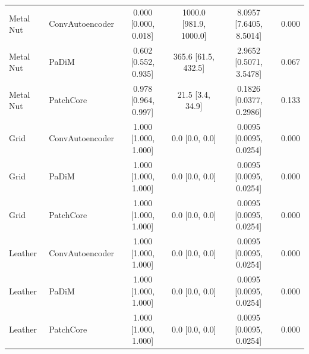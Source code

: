 \begin{table}[t]
{\begin{tabular}{llcccc}
\midrule
Metal Nut & ConvAutoencoder & 0.000 [0.000, 0.018] & 1000.0 [981.9, 1000.0] & 8.0957 [7.6405, 8.5014] & 0.000 \\
Metal Nut & PaDiM & 0.602 [0.552, 0.935] & 365.6 [61.5, 432.5] & 2.9652 [0.5071, 3.5478] & 0.067 \\
Metal Nut & PatchCore & 0.978 [0.964, 0.997] & 21.5 [3.4, 34.9] & 0.1826 [0.0377, 0.2986] & 0.133 \\
\midrule
Grid & ConvAutoencoder & 1.000 [1.000, 1.000] & 0.0 [0.0, 0.0] & 0.0095 [0.0095, 0.0254] & 0.000 \\
Grid & PaDiM & 1.000 [1.000, 1.000] & 0.0 [0.0, 0.0] & 0.0095 [0.0095, 0.0254] & 0.000 \\
Grid & PatchCore & 1.000 [1.000, 1.000] & 0.0 [0.0, 0.0] & 0.0095 [0.0095, 0.0254] & 0.000 \\
\midrule
Leather & ConvAutoencoder & 1.000 [1.000, 1.000] & 0.0 [0.0, 0.0] & 0.0095 [0.0095, 0.0254] & 0.000 \\
Leather & PaDiM & 1.000 [1.000, 1.000] & 0.0 [0.0, 0.0] & 0.0095 [0.0095, 0.0254] & 0.000 \\
Leather & PatchCore & 1.000 [1.000, 1.000] & 0.0 [0.0, 0.0] & 0.0095 [0.0095, 0.0254] & 0.000 \\
\bottomrule
\end{tabular}}
\end{table}
